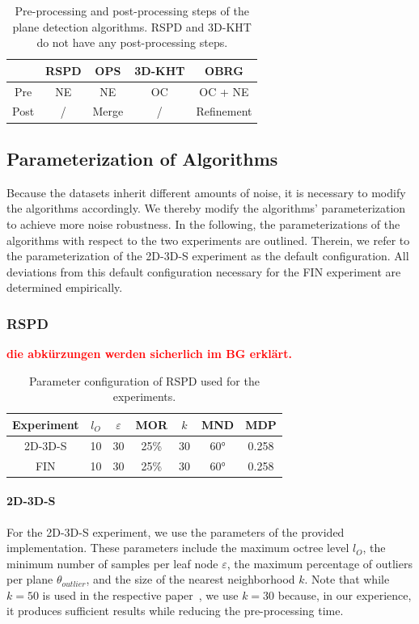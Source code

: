 \documentclass[main.tex]{subfiles}
\begin{document}
\begin{table}[H]
    \centering
    \begin{tabular}{c|cccc}
             & RSPD & OPS   & 3D-KHT & OBRG       \\ \hline
        Pre  & NE   & NE    & OC     & OC + NE    \\
        Post & /    & Merge & /      & Refinement
    \end{tabular}
    \caption{Pre-processing and post-processing steps of the plane detection algorithms. RSPD and 3D-KHT do not have any post-processing steps.}
    \label{tab:pre-post}
\end{table}

\subsection{Parameterization of Algorithms}
Because the datasets inherit different amounts of noise, it is necessary to modify the algorithms accordingly.
We thereby modify the algorithms' parameterization to achieve more noise robustness.
In the following, the parameterizations of the algorithms with respect to the two experiments are outlined.
Therein, we refer to the parameterization of the 2D-3D-S experiment as the default configuration.
All deviations from this default configuration necessary for the FIN experiment are determined empirically.


\subsubsection{RSPD}
\textbf{\textcolor{red}{die abkürzungen werden sicherlich im BG erklärt.}}
\begin{table}[H]
    \centering
    \begin{tabular}{c|cccccc}
        Experiment & $l_O$ & $\varepsilon$ & MOR  & $k$ & MND & MDP   \\ \hline
        2D-3D-S    & 10    & 30            & 25\% & 30  & 60° & 0.258 \\
        FIN        & 10    & 30            & 25\% & 30  & 60° & 0.258
    \end{tabular}%
    \caption{Parameter configuration of RSPD used for the experiments.}
    \label{tab:rspd-param}
\end{table}

\paragraph{2D-3D-S}
For the 2D-3D-S experiment, we use the parameters of the provided implementation. These parameters include the maximum octree level $l_O$,
the minimum number of samples per leaf node $\varepsilon$, the maximum percentage of outliers per plane $\theta_{outlier}$, and
the size of the nearest neighborhood $k$. Note that while $k=50$ is used in the respective paper~\cite[Section~3.3]{Araújo_Oliveira_2020},
we use $k=30$ because, in our experience, it produces sufficient results while reducing the pre-processing time.
\end{document}
